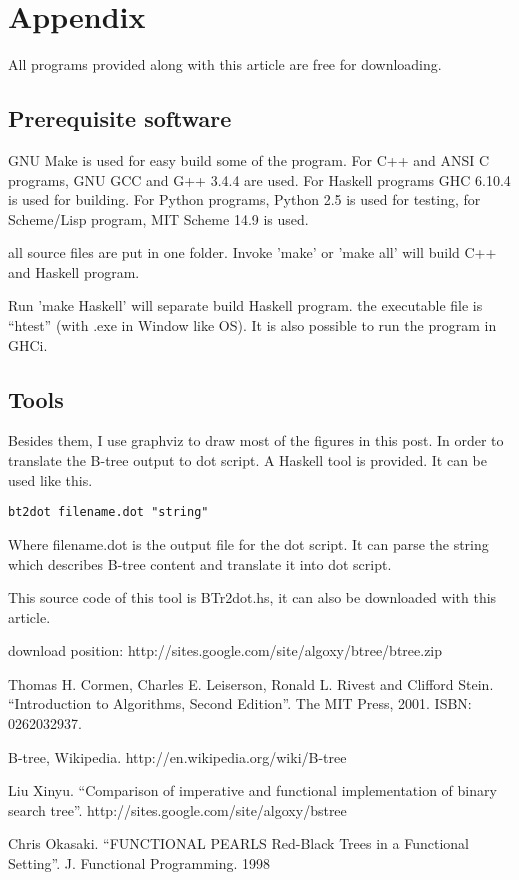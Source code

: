 \documentclass{article}
\begin{document}
\section{Appendix} \label{appendix}
All programs provided along with this article are free for
downloading.

\subsection{Prerequisite software}
GNU Make is used for easy build some of the program. For C++ and ANSI C programs,
GNU GCC and G++ 3.4.4 are used.
For Haskell programs GHC 6.10.4 is used
for building. For Python programs, Python 2.5 is used for testing, for
Scheme/Lisp program, MIT Scheme 14.9 is used.

all source files are put in one folder. Invoke 'make' or 'make all'
will build C++ and Haskell program.

Run 'make Haskell' will separate build Haskell program. the executable
file is ``htest'' (with .exe
in Window like OS). It is also possible to run the program in GHCi.

\subsection{Tools}

Besides them, I use graphviz to draw most of the figures in this post. In order to
translate the B-tree output to dot script. A Haskell tool is provided.
It can be used like this.

\begin{verbatim}
bt2dot filename.dot "string"
\end{verbatim}

Where filename.dot is the output file for the dot script. It can
parse the string which describes B-tree content and translate it
into dot script.

This source code of this tool is BTr2dot.hs, it can also be downloaded
with this article.

download position: http://sites.google.com/site/algoxy/btree/btree.zip

\begin{thebibliography}{99}

Thomas H. Cormen, Charles E. Leiserson, Ronald L. Rivest and Clifford Stein. ``Introduction to Algorithms, Second Edition''. The MIT Press, 2001. ISBN: 0262032937.

B-tree, Wikipedia. http://en.wikipedia.org/wiki/B-tree

Liu Xinyu. ``Comparison of imperative and functional implementation of
binary search tree''. http://sites.google.com/site/algoxy/bstree

Chris Okasaki. ``FUNCTIONAL PEARLS Red-Black Trees in a Functional Setting''. J. Functional Programming. 1998

\end{thebibliography}

\ifx\wholebook\relax \else
\end{document}
